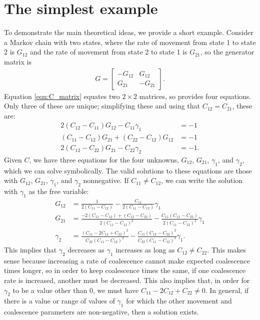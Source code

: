 \documentclass{article}
\newif\ifsubmission
\begin{document}
\newpage


\appendix
\renewcommand{\thefigure}{S\arabic{figure}}
\setcounter{figure}{0}
\ifsubmission
    \renewcommand{\thepostfigure}{S\arabic{postfigure}}
    \setcounter{postfigure}{0}
\fi


\section{The simplest example}
\label{ss:simple_example}

To demonstrate the main theoretical ideas,
we provide a short example.
Consider a Markov chain with two states, 
where the rate of movement from state 1 to state 2 is $G_{12}$
and the rate of movement from state 2 to state 1 is $G_{21}$,
so the generator matrix is
\begin{align*}
G = 
    \begin{bmatrix}
        -G_{12}  & G_{12} \\
         G_{21}  & -G_{21}
    \end{bmatrix}.
\end{align*}
Equation \ref{eqn:C_matrix} equates two $2 \times 2$ matrices,
so provides four equations. Only three of these are unique;
simplifying these and using that $C_{12} = C_{21}$, these are:
\begin{align*}
    2 \left(C_{12} - C_{11} \right) G_{12} - C_{11} \gamma_1 &= -1 \\
    \left(C_{11} - C_{12} \right) G_{21} + \left(C_{22} - C_{12}\right) G_{12} &= -1 \\
    2 \left( C_{12} - C_{22} \right) G_{21} - C_{22} \gamma_2 &= -1 .
\end{align*}
Given $C$, we have three equations for the four unknowns, 
$G_{12}$, $G_{21}$, $\gamma_{1}$, and $\gamma_{2}$,
which we can solve symbolically.
The valid solutions to these equations are those with $G_{12}$, $G_{21}$, $\gamma_1$,
and $\gamma_2$ nonnegative.
If $C_{11} \neq C_{12}$, 
we can write the solution with $\gamma_1$ as the free variable:
\begin{align*}
G_{12} &= \frac{1}{2(C_{11} - C_{12})} - \frac{C_{11}}{2(C_{11} - C_{12})}\gamma_1 \\
G_{21} &= \frac{-2(C_{11} - C_{12}) + (C_{12} - C_{22})}{2(C_{11} - C_{12})^2}
	- \frac{C_{11}(C_{12} - C_{22})}{2(C_{11} - C_{12})^2}\gamma_1 \\
\gamma_2 &= \frac{(C_{11} - 2C_{12} + C_{22})^2}{C_{22}(C_{11} - C_{12})^2}
	- \frac{C_{11}(C_{12} - C_{22})^2}{C_{22}(C_{11} - C_{12})^2}\gamma_1.
\end{align*}
This implies that $\gamma_2$ decreases as $\gamma_1$ increases as long as $C_{12} \neq C_{22}$.
This makes sense because
increasing a rate of coalescence cannot make expected coalescence times longer,
so in order to keep coalescence times the same,
if one coalescence rate is increased, another must be decreased.
This also implies that, in order for $\gamma_2$ to be a value other than $0$, 
we must have $C_{11} - 2C_{12} + C_{22} \neq 0$.
In general, if there is a value or range of values of $\gamma_1$
for which the other movement and coalescence parameters are non-negative,
then a solution exists.
\end{document}
